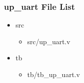 \subsubsection{up\_uart File List}
\begin{itemize}
\item src
	\begin{itemize}
	\item src/up\_uart.v
	\end{itemize}
\item tb
	\begin{itemize}
	\item tb/tb\_up\_uart.v
	\end{itemize}
\end{itemize}
